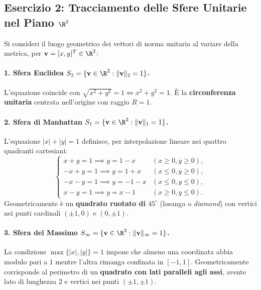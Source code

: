 \subsection{Esercizio 2: Tracciamento delle Sfere Unitarie nel Piano \texorpdfstring{$\R^2$}{R2}}
Si consideri il luogo geometrico dei vettori di norma unitaria al variare della metrica, per $\mathbf{v} = [x, y]^T \in \R^2$:

\paragraph{1. Sfera Euclidea $S_2 = \{ \mathbf{v} \in \R^2 : \|\mathbf{v}\|_2 = 1 \}$.}
L'equazione coincide con $\sqrt{x^2 + y^2} = 1 \iff x^2 + y^2 = 1$. È la \textbf{circonferenza unitaria} centrata nell'origine con raggio $R = 1$.

\paragraph{2. Sfera di Manhattan $S_1 = \{ \mathbf{v} \in \R^2 : \|\mathbf{v}\|_1 = 1 \}$.}
L'equazione $|x| + |y| = 1$ definisce, per interpolazione lineare nei quattro quadranti cartesiani:
\begin{equation}
    \begin{cases}
        x + y = 1 \implies y = 1 - x & (x \ge 0, y \ge 0), \\
        -x + y = 1 \implies y = 1 + x & (x \le 0, y \ge 0), \\
        -x - y = 1 \implies y = -1 - x & (x \le 0, y \le 0), \\
        x - y = 1 \implies y = x - 1 & (x \ge 0, y \le 0).
    \end{cases}
\end{equation}
Geometricamente è un \textbf{quadrato ruotato di $45^\circ$} (losanga o \textit{diamond}) con vertici nei punti cardinali $(\pm 1, 0)$ e $(0, \pm 1)$.

\paragraph{3. Sfera del Massimo $S_\infty = \{ \mathbf{v} \in \R^2 : \|\mathbf{v}\|_\infty = 1 \}$.}
La condizione $\max\{|x|, |y|\} = 1$ impone che almeno una coordinata abbia modulo pari a $1$ mentre l'altra rimanga confinata in $[-1, 1]$. Geometricamente corrisponde al perimetro di un \textbf{quadrato con lati paralleli agli assi}, avente lato di lunghezza $2$ e vertici nei punti $(\pm 1, \pm 1)$.


